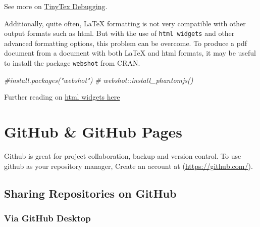 \documentclass[
]{book}
\newenvironment{Shaded}{\begin{snugshade}}{\end{snugshade}}
\newcommand{\CommentTok}[1]{\textcolor[rgb]{0.56,0.35,0.01}{\textit{#1}}}
\begin{document}
See more on \href{https://yihui.org/tinytex/r/}{TinyTex Debugging}.

Additionally, quite often, LaTeX formatting is not very compatible with other output formats such as html. But with the use of \texttt{html\ widgets} and other advanced formatting options, this problem can be overcome.
To produce a pdf document from a document with both LaTeX and html formats, it may be useful to install the package \texttt{webshot} from CRAN.

\begin{Shaded}
\begin{Highlighting}[]
\CommentTok{\#install.packages("webshot")  }
\CommentTok{\# webshot::install\_phantomjs() }
\end{Highlighting}
\end{Shaded}

Further reading on \href{https://bookdown.org/yihui/bookdown/html-widgets.html}{html widgets here}

\hypertarget{github-github-pages}{%
\chapter{GitHub \& GitHub Pages}\label{github-github-pages}}

Github is great for project collaboration, backup and version control.
To use github as your repository manager, Create an account at (\url{https://github.com/}).

\hypertarget{sharing-repositories-on-github}{%
\section{Sharing Repositories on GitHub}\label{sharing-repositories-on-github}}

\hypertarget{via-github-desktop}{%
\subsection{Via GitHub Desktop}\label{via-github-desktop}}
\end{document}
